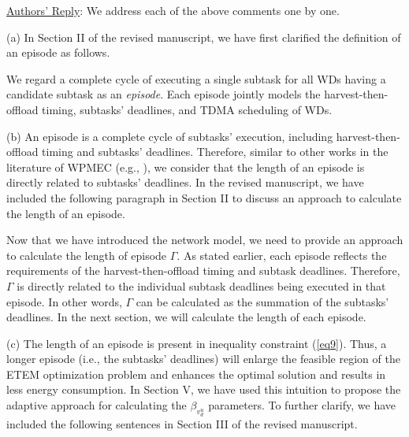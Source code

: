 \documentclass[12pt,draftclsnofoot,onecolumn]{IEEEtran}
\newcommand{\rev}[1]{{\color{blue}#1}} %
\newcommand{\rev}[1]{#1}
\newenvironment{my}[2]%
{\begin{list}{}%
{\setlength{\rightmargin}{#1}\setlength{\leftmargin}{#2}}%


 \item[]{}

} {\end{list}}
\begin{document}
\begin{enumerate}
\underline{Authors' Reply}: We address each of the above comments one by one.\newline

(a) In Section II of the revised manuscript, we have first clarified the definition of an episode as follows.\\

\begin{my}{1cm}{1cm}
\rev{We regard a complete cycle of executing a single subtask for all
	WDs having a candidate subtask as an \textit{episode}. Each episode
	jointly models the harvest-then-offload timing, subtasks' deadlines, and TDMA scheduling of WDs.}\newline

\end{my}

(b) An episode is a complete cycle of subtasks' execution, including harvest-then-offload timing and subtasks' deadlines. Therefore, similar to other works in the literature of WPMEC (e.g., \cite{b2,b13,b28}), we consider that the length of an episode is directly related to subtasks' deadlines. In the revised manuscript, we have included the following paragraph in Section II to discuss an approach to calculate the length of an episode.\newline

\begin{my}{1cm}{1cm}
	\rev{Now that we have introduced the network model, we need to provide an approach to calculate the length of episode $\Gamma$. As stated earlier, each episode reflects the requirements of the harvest-then-offload timing and subtask deadlines. Therefore, $\Gamma$ is directly related to the individual subtask deadlines being executed in that episode. In other words, $\Gamma$ can be calculated as the summation of the subtasks' deadlines. In the next section, we will calculate the length of each episode.}\newline
	
\end{my}

(c) The length of an episode is present in inequality constraint (\ref{eq9}). Thus, a longer episode (i.e., the subtasks' deadlines) will enlarge the feasible region of the ETEM optimization problem and enhances the optimal solution and results in less energy consumption. In Section V, we have used this intuition to propose the adaptive approach for calculating the $\beta_{v_d^u}$ parameters. To further clarify, we have included the following sentences in Section III of the revised manuscript.\newline


\end{enumerate}
\end{document}

